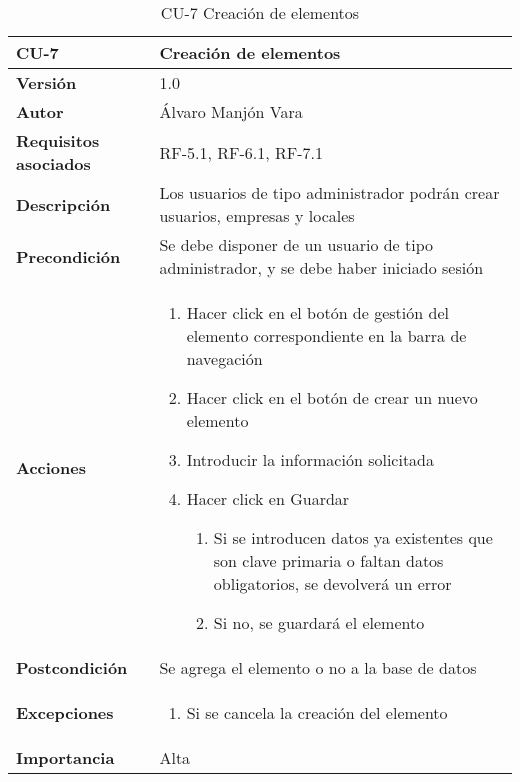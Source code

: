 \begin{table}[htp]
	\centering
	\begin{tabularx}{\linewidth}{ p{} p{} }
		\toprule
		\textbf{CU-7}    & \textbf{Creación de elementos}\\
		\toprule
		\textbf{Versión}              & 1.0    \\
		\textbf{Autor}                & Álvaro Manjón Vara \\
		\textbf{Requisitos asociados} & RF-5.1, RF-6.1, RF-7.1 \\
		\textbf{Descripción}          & Los usuarios de tipo administrador podrán crear usuarios, empresas y locales \\
		\textbf{Precondición}         & Se debe disponer de un usuario de tipo administrador, y se debe haber iniciado sesión \\
		\textbf{Acciones}             &
		\begin{enumerate}
			\def\labelenumi{\arabic{enumi}.}
			\tightlist
			\item Hacer click en el botón de gestión del elemento correspondiente en la barra de navegación
			\item Hacer click en el botón de crear un nuevo elemento
			\item Introducir la información solicitada
			\item Hacer click en Guardar
			\begin{enumerate}
				\item Si se introducen datos ya existentes que son clave primaria o faltan datos obligatorios, se devolverá un error
				\item Si no, se guardará el elemento
			\end{enumerate}
		\end{enumerate}\\
		\textbf{Postcondición}        & Se agrega el elemento o no a la base de datos \\
		\textbf{Excepciones}          & \begin{enumerate}
  \item Si se cancela la creación del elemento
\end{enumerate}
 \\
		\textbf{Importancia}          & Alta \\
		\bottomrule
	\end{tabularx}
	\caption{CU-7 Creación de elementos}
\end{table}
\afterpage{\clearpage}

